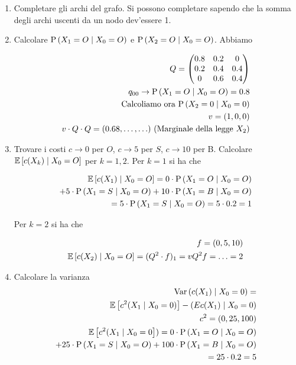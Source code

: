 \begin{enumerate}
	\item Completare gli archi del grafo. Si possono completare sapendo che la somma degli archi uscenti da un nodo dev'essere 1.
	\item Calcolare $ \text{P}\left(X_1 = O \mid X_0 = O\right) $ e $ \text{P}\left(X_2 = O \mid X_0 = O\right) $. Abbiamo
	
	\begin{equation*}
		\begin{aligned}
		Q = \begin{pmatrix}
		0.8 & 0.2 & 0 \\
		0.2 & 0.4 & 0.4 \\
		0 & 0.6 & 0.4
		\end{pmatrix} \\
		q_{00} \to \text{P}\left(X_1 = O \mid X_0 = O\right) = 0.8 \\
		\text{Calcoliamo ora } \text{P}\left(X_2 = 0 \mid X_0 = 0\right) \\
		v = (1, 0, 0) \\
		v \cdot Q \cdot Q = (0.68, \hdots, \hdots) \text{ (Marginale della legge } X_2)
		\end{aligned} 
	\end{equation*}
	
	\item Trovare i costi $ c \to 0 $ per $ O $, $ c \to 5 $ per $ S $, $ c \to 10 $ per B. Calcolare $ \mathbb{E}\left[c(X_k) \mid X_0 = O\right] $ per $ k = 1,2 $.
	Per $ k = 1 $ si ha che 
	
	\begin{equation*}
		\begin{aligned}
		\mathbb{E}\left[c(X_1) \mid X_0 = O\right] = 0 \cdot \text{P}\left(X_1 = O \mid X_0 = O \right) \\
		+ 5 \cdot \text{P}\left(X_1 = S \mid X_0 = O\right) + 10 \cdot \text{P}\left(X_1 = B \mid X_0 = O\right) \\
		= 5 \cdot \text{P}\left(X_1 = S \mid X_0 = O\right) = 5 \cdot 0.2 = 1 
		\end{aligned}
	\end{equation*}

	Per $ k = 2 $ si ha che
	
	\begin{equation*}
		\begin{aligned} 
		f = (0, 5, 10) \\
		\mathbb{E}\left[c(X_2) \mid X_0 = O\right] = (Q^2 \cdot f)_1 = vQ^2f = \hdots = 2
		\end{aligned}
	\end{equation*}
	
	\item Calcolare la varianza 
	\begin{equation*}
		\begin{aligned}
		\text{Var}\left(c(X_1) \mid X_0 = 0\right) = \\
		\mathbb{E}\left[c^2(X_1 \mid X_0 = 0)\right] - (E{c(X_1) \mid X_0 = 0}) \\
		c^2=(0, 25, 100) \\
		\mathbb{E}\left[c^2(X_1 \mid X_0 = 0\right]) = 0 \cdot \text{P}\left(X_1 = O \mid X_0 = O \right) \\
		+ 25 \cdot \text{P}\left(X_1 = S \mid X_0 = O \right) + 100 \cdot \text{P}\left(X_1 = B \mid X_0 = O \right) \\ 
		= 25 \cdot 0.2 = 5
		\end{aligned}
	\end{equation*}
	

\end{enumerate}
